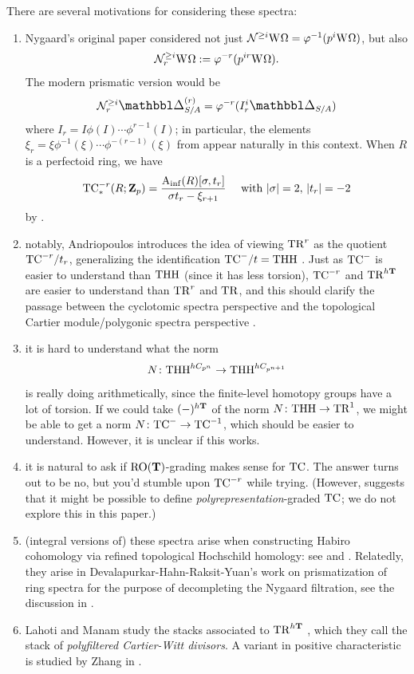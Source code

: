 There are several motivations for considering these spectra:
\begin{enumerate}
  \item Nygaard's original paper \cite{Nygaard} considered not just $\mathcal N^{\ge i}\mathrm W_{}\Omega=\varphi^{-1}(p^i\mathrm W_{}\Omega)$, but also
    \[ \mathcal N^{\ge i}_r \mathrm W_{}\Omega \mathrel{:=} \varphi^{-r}(p^{ir}\mathrm W_{}\Omega). \]
    The modern prismatic version would be
    \[ \Nyg^{\ge i}_r \prism^{(r)}_{S/A} = \varphi^{-r}(I_r^i\prism_{S/A}) \]
    where $I_r = I\phi(I)\dotsm\phi^{r-1}(I)$; in particular, the elements $\xi_r=\xi\phi^{-1}(\xi)\dotsm\phi^{-(r-1)}(\xi)$ from \cite[Lemma 3.12]{BMS1} appear naturally in this context. When $R$ is a perfectoid ring, we have
    \[ \mathrm{TC}^{-r}_*(R;\mathbf Z_p) = \frac{{ \mathrm A_{\mathrm{inf}} }(R)[\sigma, t_r]}{\sigma t_r - \xi_{r+1}} \quad \text{ with }|\sigma|=2,\, |t_r|=-2 \]
    by \cite[Proposition 3.4]{AndriopoulosHigherNygaard}.

  \item \label{enum:tc-r} notably, Andriopoulos introduces the idea of viewing $\mathrm{TR}^r$ as the quotient $\mathrm{TC}^{-r}/t_r$, generalizing the identification $\mathrm{TC}^-/t = \mathrm{THH}$ \cite[Proposition 3.6]{AndriopoulosHigherNygaard}. Just as $\mathrm{TC}^-$ is easier to understand than $\mathrm{THH}$ (since it has less torsion), $\mathrm{TC}^{-r}$ and $\mathrm{TR}^{h\mathbf T}$ are easier to understand than $\mathrm{TR}^r$ and $\mathrm{TR}$, and this should clarify the passage between the cyclotomic spectra perspective and the topological Cartier module/polygonic spectra perspective \cite{TCart,KMNPolygonic}.

  \item it is hard to understand what the norm
    \[ N\colon \mathrm{THH}^{hC_{p^n}} \to \mathrm{THH}^{hC_{p^{n+1}}} \]
    is really doing arithmetically, since the finite-level homotopy groups have a lot of torsion. If we could take $(-)^{h\mathbf T}$ of the norm $N\colon \mathrm{THH} \to \mathrm{TR}^1$, we might be able to get a norm $N\colon \mathrm{TC}^- \to \mathrm{TC}^{-1}$, which should be easier to understand. However, it is unclear if this works.

  \item it is natural to ask if $\operatorname{RO}(\mathbf T)$-grading makes sense for $\mathrm{TC}$. The answer turns out to be no, but you'd stumble upon $\mathrm{TC}^{-r}$ while trying. (However, \cite[Corollary 1.2]{DMCurves} suggests that it might be possible to define \emph{polyrepresentation}-graded $\mathrm{TC}$; we do not explore this in this paper.)

  \item (integral versions of) these spectra arise when constructing Habiro cohomology via refined topological Hochschild homology: see \cite[1.23]{RefinedTC-} and \cite[Theorem 6.5]{HabiroCohomology}. Relatedly, they arise in Devalapurkar-Hahn-Raksit-Yuan's work on prismatization of ring spectra \cite{PrismatizationRingSpectra} for the purpose of decompleting the Nygaard filtration, see the discussion in \cite[Chapter 7]{DevalapurkarThesis}. 

  \item Lahoti and Manam study the stacks associated to $\mathrm{TR}^{h\mathbf T}$ \cite[]{LMCohomologyModuliRingStacks}, which they call the stack of \emph{polyfiltered Cartier-Witt divisors}. A variant in positive characteristic is studied by Zhang in \cite{StackyDRW}.
\end{enumerate}

